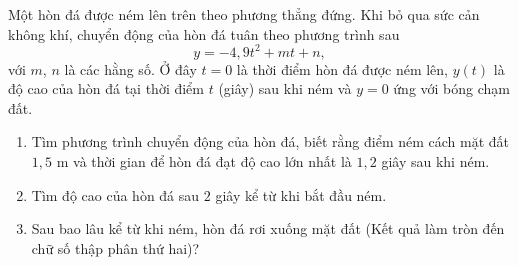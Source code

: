 \begin{bt}%
	Một hòn đá được ném lên trên theo phương thẳng đứng. Khi bỏ qua sức cản không khí, chuyển động của hòn đá tuân theo phương trình sau
	$$y=-4{,}9t^2+mt+n,$$
	với $m$, $n$ là các hằng số. Ở đây $t=0$ là thời điểm hòn đá được ném lên, $y(t)$ là độ cao của hòn đá tại thời điểm $t$ (giây) sau khi ném và $y=0$ ứng với bóng chạm đất.
	\begin{enumerate}
		\item Tìm phương trình chuyển động của hòn đá, biết rằng điểm ném cách mặt đất $1{,}5$ m và thời gian để hòn đá đạt độ cao lớn nhất là $1{,}2$ giây sau khi ném.
		\item Tìm độ cao của hòn đá sau $2$ giây kể từ khi bắt đầu ném.
		\item Sau bao lâu kể từ khi ném, hòn đá rơi xuống mặt đất (Kết quả làm tròn đến chữ số thập phân thứ hai)?
	\end{enumerate}
\end{bt}


